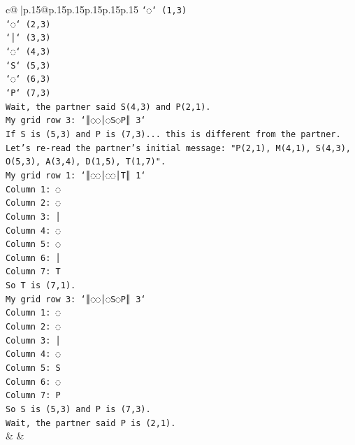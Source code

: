 \documentclass{article}
\begin{document}
{\begin{supertabular}{c@{$\;$}|p{.15\linewidth}@{}p{.15\linewidth}p{.15\linewidth}p{.15\linewidth}p{.15\linewidth}p{.15\linewidth}}
{{{\texttt{`◌` (1,3)} \\
\texttt{`◌` (2,3)} \\
\texttt{`│` (3,3)} \\
\texttt{`◌` (4,3)} \\
\texttt{`S` (5,3)} \\
\texttt{`◌` (6,3)} \\
\texttt{`P` (7,3)} \\
\texttt{Wait, the partner said S(4,3) and P(2,1).} \\
\texttt{My grid row 3: `║◌◌│◌S◌P║ 3`} \\
\texttt{If S is (5,3) and P is (7,3)... this is different from the partner.} \\
\texttt{Let's re{-}read the partner's initial message: "P(2,1), M(4,1), S(4,3), O(5,3), A(3,4), D(1,5), T(1,7)".} \\
\texttt{My grid row 1: `║◌◌│◌◌│T║ 1`} \\
\texttt{Column 1: ◌} \\
\texttt{Column 2: ◌} \\
\texttt{Column 3: │} \\
\texttt{Column 4: ◌} \\
\texttt{Column 5: ◌} \\
\texttt{Column 6: │} \\
\texttt{Column 7: T} \\
\texttt{So T is (7,1).} \\
\texttt{My grid row 3: `║◌◌│◌S◌P║ 3`} \\
\texttt{Column 1: ◌} \\
\texttt{Column 2: ◌} \\
\texttt{Column 3: │} \\
\texttt{Column 4: ◌} \\
\texttt{Column 5: S} \\
\texttt{Column 6: ◌} \\
\texttt{Column 7: P} \\
\texttt{So S is (5,3) and P is (7,3).} \\
\texttt{Wait, the partner said P is (2,1).} \\
            }
        }
    }
    & & \\ \\


\end{supertabular}}
\end{document}
